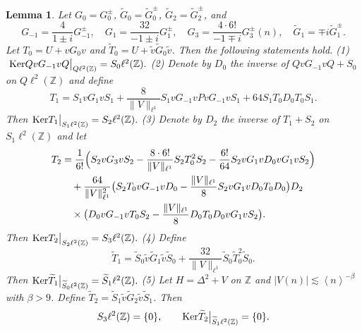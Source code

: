 \documentclass[reqno, 11pt]{amsart}
\newtheorem{lemma}[definition]{Lemma}
\newcommand\Z{\mathbb{Z}}
\numberwithin{equation}{section}
\begin{document}
\begin{lemma}\label{lemma of kernel and operaor}
Let $G_0=G^{\pm}_0$,  $\widetilde{G}_0=\widetilde{G}^{\pm}_0$, $\widetilde{G}_2=\widetilde{G}^{\pm}_2$, and $$G_{-1}=\frac{4}{1\pm i}G^{\pm}_{-1},\quad G_{1}=\frac{32}{-1\pm i}G^{\pm}_{1},\quad G_3=\frac{4\cdot6!}{-1\mp i}G^{\pm}_{3}(n),\quad \widetilde{G}_1=\mp i\widetilde{G}^{\pm}_1.$$
 Let $T_0=U+vG_0v$ and $\widetilde{T}_0=U+\tilde{v}\widetilde{G}_0\tilde{v}$. Then the following statements hold.
\vskip0.1cm
{\rm(1)}$~
{\rm Ker}QvG_{-1}vQ\big|_{Q\ell^2(\Z)}=S_0\ell^2(\Z).$
\vskip0.2cm
{\rm(2)} Denote by $D_0$ the inverse of $QvG_{-1}vQ+S_0$ on $Q\ell^2(\Z)$ and define
 \begin{equation}\label{T1}
T_1=S_1vG_1vS_1+\frac{8}{\|V\|_{\ell^1}}S_1vG_{-1}vPvG_{-1}vS_1+64S_1T_0D_0T_0S_1.
\end{equation}
Then
${\rm Ker}T_1\big|_{S_1\ell^2(\Z)}=S_2\ell^2(\Z).$
\vskip0.2cm
{\rm(3)} Denote by $D_2$ the inverse of $T_1+S_2$ on $S_1\ell^2(\Z)$ and let
\begin{align}\label{T2}
T_2&=\frac{1}{6!}\Big(S_2vG_3vS_2-\frac{8\cdot6!}{\|V\|_{\ell^1}}S_2T^2_0S_2-\frac{6!}{64}S_2vG_1vD_0vG_1vS_2\Big)\notag\\
&\quad+\frac{64}{\|V\|^2_{\ell^1}}\big(S_2T_0vG_{-1}vD_0-\frac{\|V\|_{\ell^1}}{8}S_2vG_1vD_0T_0D_0\big)D_2\\
&\quad\times \big(D_0vG_{-1}vT_0S_2-\frac{\|V\|_{\ell^1}}{8}D_0T_0D_0vG_1vS_2\big).\notag
\end{align}
Then
${\rm Ker}T_2\big|_{S_2\ell^2(\Z)}=S_3\ell^2(\Z).$
\vskip0.2cm
{\rm(4)} Define
\begin{equation}\label{T1tuta}
\widetilde{T}_1=\widetilde{S}_0\tilde{v}\widetilde{G}_1\tilde{v}\widetilde{S}_0+\frac{32}{\|V\|_{\ell^1}}\widetilde{S}_0\widetilde{T}^2_0\widetilde{S}_0.
\end{equation}
Then
${\rm Ker}\widetilde{T}_1\big|_{\widetilde{S}_0\ell^2(\Z)}=\widetilde{S}_1\ell^2(\Z).$
\vskip0.2cm
{\rm(5)} Let $H=\Delta^2+V$ on $\Z$ and $|V(n)|\lesssim\left<n\right>^{-\beta}$ with $\beta>9$. Define $\widetilde{T}_2=\widetilde{S}_1\tilde{v}\widetilde{G}_2\tilde{v}\widetilde{S}_1$. Then
$$S_3\ell^2(\Z)=\{0\},\qquad{\rm Ker}\widetilde{T}_2\big|_{\widetilde{S}_1\ell^2(\Z)}=\{0\}.$$
\end{lemma}
\end{document}
